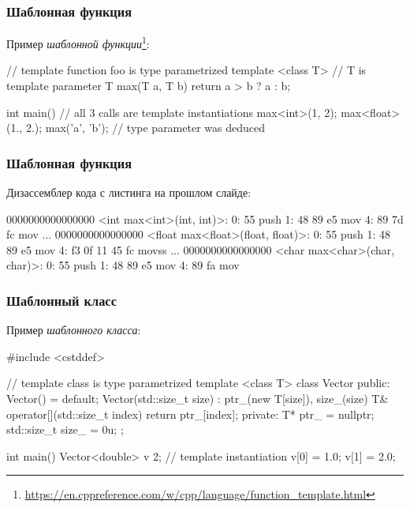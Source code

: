 \documentclass[compress, 8pt, aspectratio=169]{beamer}
\begin{document}
  \begin{frame}[fragile]

    \frametitle{Шаблонная функция}

    Пример \textit{шаблонной функции}\footnote{\url{https://en.cppreference.com/w/cpp/language/function\_template.html}}:

    \begin{myinplacelisting}[minted language=cpp]
// template function foo is type parametrized
template <class T> // T is template parameter
T max(T a, T b)
{
    return a > b ? a : b;
}

int main() {
    // all 3 calls are template instantiations
    max<int>(1, 2);
    max<float>(1., 2.);
    max('a', 'b'); // type parameter was deduced
}
    \end{myinplacelisting}

  \end{frame}

  \begin{frame}[fragile]

    \frametitle{Шаблонная функция}

    Дизассемблер кода с листинга на прошлом слайде:

    \begin{myinplacelisting}[minted language=text]
0000000000000000 <int max<int>(int, int)>:
   0:   55                      push   %
   1:   48 89 e5                mov    %
   4:   89 7d fc                mov    %
...
0000000000000000 <float max<float>(float, float)>:
   0:   55                      push   %
   1:   48 89 e5                mov    %
   4:   f3 0f 11 45 fc          movss  %
...
0000000000000000 <char max<char>(char, char)>:
   0:   55                      push   %
   1:   48 89 e5                mov    %
   4:   89 fa                   mov    %
    \end{myinplacelisting}

  \end{frame}

  \begin{frame}[fragile]

    \frametitle{Шаблонный класс}

    Пример \textit{шаблонного класса}\footnotemark{}:


    \begin{myinplacelisting}[minted language=cpp]
#include <cstddef>

// template class is type parametrized
template <class T>
class Vector {
public:
    Vector() = default;
    Vector(std::size_t size) : ptr_(new T[size]), size_(size)
    {}
    T& operator[](std::size_t index) { return ptr_[index]; }
private:
    T* ptr_ = nullptr;
    std::size_t size_ = 0u;
};

int main() {
    Vector<double> v {2}; // template instantiation
    v[0] = 1.0;
    v[1] = 2.0;
}
    \end{myinplacelisting}

  \end{frame}
\end{document}
